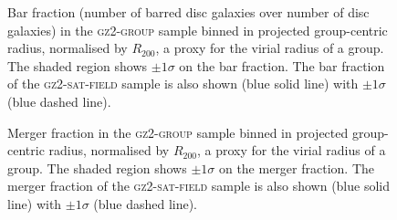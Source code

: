 \documentclass[useAMS,usenatbib]{mn2e}
\begin{document}
\begin{figure}
\caption[Bar fraction with group radius in the \textsc{gz2-group} sample]{Bar fraction (number of barred disc galaxies over number of disc galaxies) in the \textsc{gz2-group} sample binned in projected group-centric radius, normalised by $R_{200}$, a proxy for the virial radius of a group. The shaded region shows $\pm1\sigma$ on the bar fraction. The bar fraction of the \textsc{gz2-sat-field} sample is also shown (blue solid line) with $\pm1\sigma$ (blue dashed line).}
\label{fig:barradius}
\end{figure}

\begin{figure}
\caption[Merger fraction with group radius in the \textsc{gz2-group} sample]{Merger fraction in the \textsc{gz2-group} sample binned in projected group-centric radius, normalised by $R_{200}$, a proxy for the virial radius of a group. The shaded region shows $\pm1\sigma$ on the merger fraction. The merger fraction of the \textsc{gz2-sat-field} sample is also shown (blue solid line) with $\pm1\sigma$ (blue dashed line).}
\label{fig:mergerradius}
\end{figure}
\end{document}
